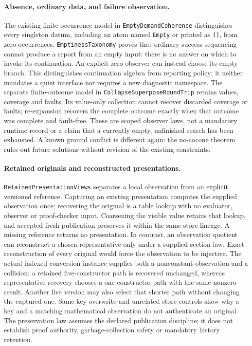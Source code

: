\documentclass[11pt]{article}
\theoremstyle{definition}
\theoremstyle{remark}
\begin{document}
\paragraph{Absence, ordinary data, and failure observation.}
The existing finite-occurrence model in \texttt{EmptyDemandCoherence}
distinguishes every singleton datum, including an atom named
\texttt{Empty} or printed as \texttt{()}, from zero occurrences.
\texttt{EmptinessTaxonomy} proves that ordinary success sequencing cannot
produce a report from an empty input: there is no answer on which to invoke
its continuation. An explicit zero observer can instead choose its empty
branch. This distinguishes continuation algebra from reporting policy; it
neither mandates a quiet interface nor requires a new diagnostic namespace.
The separate finite-outcome model in \texttt{CollapseSuperposeRoundTrip}
retains values, coverage and faults. Its value-only collection cannot recover
discarded coverage or faults; re-expansion recovers the complete outcome
exactly when that outcome was complete and fault-free. These are scoped
observer laws, not a mandatory runtime record or a claim that a currently
empty, unfinished search has been exhausted. A known ground conflict is
different again: the no-cocone theorem rules out future solutions without
revision of the existing constraints.

\paragraph{Retained originals and reconstructed presentations.}
\texttt{RetainedPresentationViews} separates a local observation from an
explicit versioned reference. Capturing an existing presentation computes
the supplied observation once; recovering the original is a table lookup
with no evaluator, observer or proof-checker input. Coarsening the visible
value retains that lookup, and accepted fresh publication preserves it within
the same store lineage. A missing reference returns no presentation.
In contrast, an observation quotient can reconstruct a chosen representative
only under a supplied section law. Exact reconstruction of every original
would force the observation to be injective. The actual indexed-conversion
instance supplies both a nonconstant observation and a collision: a retained
five-constructor path is recovered unchanged, whereas representative recovery
chooses a one-constructor path with the same nonzero result. Another live
version may also select that shorter path without changing the captured one.
Same-key overwrite and unrelated-store controls show why a key and a matching
mathematical observation do not authenticate an original. The preservation
law assumes the declared publication discipline; it does not establish proof
authority, garbage-collection safety or mandatory history retention.
\end{document}
